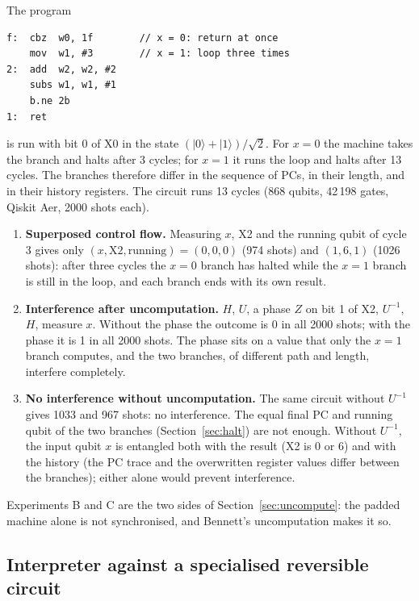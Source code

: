 \documentclass[11pt]{article}
\begin{document}
The program
\begin{lstlisting}[language={}]
f:  cbz  w0, 1f        // x = 0: return at once
    mov  w1, #3        // x = 1: loop three times
2:  add  w2, w2, #2
    subs w1, w1, #1
    b.ne 2b
1:  ret
\end{lstlisting}
is run with bit 0 of X0 in the state $(|0\rangle+|1\rangle)/\sqrt2$. For $x=0$ the machine takes the
branch and halts after 3 cycles; for $x=1$ it runs the loop and halts after 13 cycles. The branches
therefore differ in the sequence of PCs, in their length, and in their history registers. The
circuit runs 13 cycles (868 qubits, 42\,198 gates, Qiskit Aer, 2000 shots each).

\begin{enumerate}
  \item[A.] \textbf{Superposed control flow.} Measuring $x$, X2 and the running qubit of cycle 3
        gives only $(x,\mathrm{X2},\mathrm{running})=(0,0,0)$ (974 shots) and $(1,6,1)$ (1026 shots):
        after three cycles the $x=0$ branch has halted while the $x=1$ branch is still in the loop,
        and each branch ends with its own result.
  \item[B.] \textbf{Interference after uncomputation.} $H$, $U$, a phase $Z$ on bit 1 of X2, $U^{-1}$,
        $H$, measure $x$. Without the phase the outcome is 0 in all 2000 shots; with the phase it is
        1 in all 2000 shots. The phase sits on a value that only the $x=1$ branch computes, and the two
        branches, of different path and length, interfere completely.
  \item[C.] \textbf{No interference without uncomputation.} The same circuit without $U^{-1}$ gives
        1033 and 967 shots: no interference. The equal final PC and running qubit of the two branches
        (Section~\ref{sec:halt}) are not enough. Without $U^{-1}$, the input qubit $x$ is entangled
        both with the result (X2 is 0 or 6) and with the history (the PC trace and the overwritten
        register values differ between the branches); either alone would prevent interference.
\end{enumerate}

Experiments B and C are the two sides of Section~\ref{sec:uncompute}: the padded machine alone is
not synchronised, and Bennett's uncomputation makes it so.

\subsection{Interpreter against a specialised reversible circuit}
\end{document}
